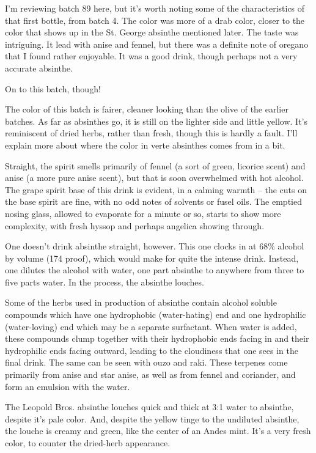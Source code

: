 \documentclass[12pt,letterpaper,oneside]{memoir}
\begin{document}
  I'm reviewing batch 89 here, but it's worth noting some of the characteristics of that first bottle, from batch 4.  The color was more of a drab color, closer to the color that shows up in the St. George absinthe mentioned later.  The taste was intriguing.  It lead with anise and fennel, but there was a definite note of oregano that I found rather enjoyable.  It was a good drink, though perhaps not a very accurate absinthe.

  On to this batch, though!

  The color of this batch is fairer, cleaner looking than the olive of the earlier batches.  As far as absinthes go, it is still on the lighter side and little yellow.  It's reminiscent of dried herbs, rather than fresh, though this is hardly a fault.  I'll explain more about where the color in verte absinthes comes from in a bit.

  Straight, the spirit smells primarily of fennel (a sort of green, licorice scent) and anise (a more pure anise scent), but that is soon overwhelmed with hot alcohol.  The grape spirit base of this drink is evident, in a calming warmth -- the cuts on the base spirit are fine, with no odd notes of solvents or fusel oils.  The emptied nosing glass, allowed to evaporate for a minute or so, starts to show more complexity, with fresh hyssop and perhaps angelica showing through.

  One doesn't drink absinthe straight, however.  This one clocks in at 68\% alcohol by volume (174 proof), which would make for quite the intense drink.  Instead, one dilutes the alcohol with water, one part absinthe to anywhere from three to five parts water.  In the process, the absinthe louches.

  Some of the herbs used in production of absinthe contain alcohol soluble compounds which have one hydrophobic (water-hating) end and one hydrophilic (water-loving) end which may be a separate surfactant.  When water is added, these compounds clump together with their hydrophobic ends facing in and their hydrophilic ends facing outward, leading to the cloudiness that one sees in the final drink.  The same can be seen with ouzo and raki.  These terpenes come primarily from anise and star anise, as well as from fennel and coriander, and form an emulsion with the water.

  The Leopold Bros. absinthe louches quick and thick at 3:1 water to absinthe, despite it's pale color.  And, despite the yellow tinge to the undiluted absinthe, the louche is creamy and green, like the center of an Andes mint.  It's a very fresh color, to counter the dried-herb appearance.
\end{document}
